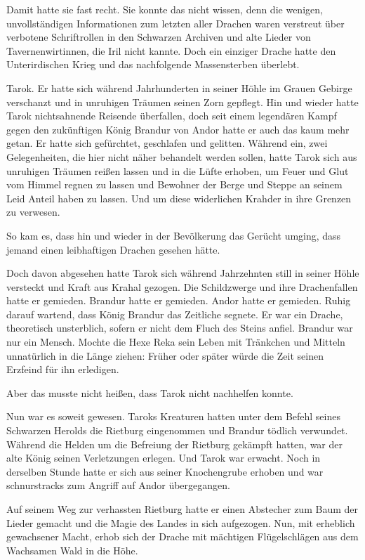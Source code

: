 Damit hatte sie fast recht. Sie konnte das nicht wissen, denn die wenigen, unvollständigen Informationen zum letzten aller Drachen waren verstreut über verbotene Schriftrollen in den Schwarzen Archiven und alte Lieder von Tavernenwirtinnen, die Iril nicht kannte. Doch ein einziger Drache hatte den Unterirdischen Krieg und das nachfolgende Massensterben überlebt.

Tarok. Er hatte sich während Jahrhunderten in seiner Höhle im Grauen Gebirge verschanzt und in unruhigen Träumen seinen Zorn gepflegt. Hin und wieder hatte Tarok nichtsahnende Reisende überfallen, doch seit einem legendären Kampf gegen den zukünftigen König Brandur von Andor hatte er auch das kaum mehr getan. Er hatte sich gefürchtet, geschlafen und gelitten. Während ein, zwei Gelegenheiten, die hier nicht näher behandelt werden sollen, hatte Tarok sich aus unruhigen Träumen reißen lassen und in die Lüfte erhoben, um Feuer und Glut vom Himmel regnen zu lassen und Bewohner der Berge und Steppe an seinem Leid Anteil haben zu lassen. Und um diese widerlichen Krahder in ihre Grenzen zu verwesen.

So kam es, dass hin und wieder in der Bevölkerung das Gerücht umging, dass jemand einen leibhaftigen Drachen gesehen hätte.

Doch davon abgesehen hatte Tarok sich während Jahrzehnten still in seiner Höhle versteckt und Kraft aus Krahal gezogen. Die Schildzwerge und ihre Drachenfallen hatte er gemieden. Brandur hatte er gemieden. Andor hatte er gemieden. Ruhig darauf wartend, dass König Brandur das Zeitliche segnete. Er war ein Drache, theoretisch unsterblich, sofern er nicht dem Fluch des Steins anfiel. Brandur war nur ein Mensch. Mochte die Hexe Reka sein Leben mit Tränkchen und Mitteln unnatürlich in die Länge ziehen: Früher oder später würde die Zeit seinen Erzfeind für ihn erledigen.

Aber das musste nicht heißen, dass Tarok nicht nachhelfen konnte.

Nun war es soweit gewesen. Taroks Kreaturen hatten unter dem Befehl seines Schwarzen Herolds die Rietburg eingenommen und Brandur tödlich verwundet. Während die Helden um die Befreiung der Rietburg gekämpft hatten, war der alte König seinen Verletzungen erlegen. Und Tarok war erwacht. Noch in derselben Stunde hatte er sich aus seiner Knochengrube erhoben und war schnurstracks zum Angriff auf Andor übergegangen.

Auf seinem Weg zur verhassten Rietburg hatte er einen Abstecher zum Baum der Lieder gemacht und die Magie des Landes in sich aufgezogen. Nun, mit erheblich gewachsener Macht, erhob sich der Drache mit mächtigen Flügelschlägen aus dem Wachsamen Wald in die Höhe.

